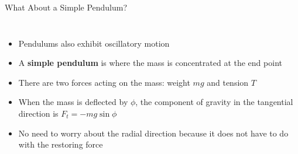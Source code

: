 \documentclass[12pt,compress,aspectratio=169]{beamer}
\begin{document}
\begin{frame}{What About a Simple Pendulum?}
  \begin{columns}
    \begin{itemize}
    \item Pendulums also exhibit oscillatory motion
    \item A \textbf{simple pendulum} is where the mass is concentrated at the
      end point
    \item There are two forces acting on the mass: weight $mg$ and tension $T$
    \item When the mass is deflected by $\phi$, the component of gravity in
      the tangential direction is $F_t=-mg\sin\phi$
    \item No need to worry about the radial direction because it does not
      have to do with the restoring force
    \end{itemize}
    
  \end{columns}
\end{frame}
\end{document}

